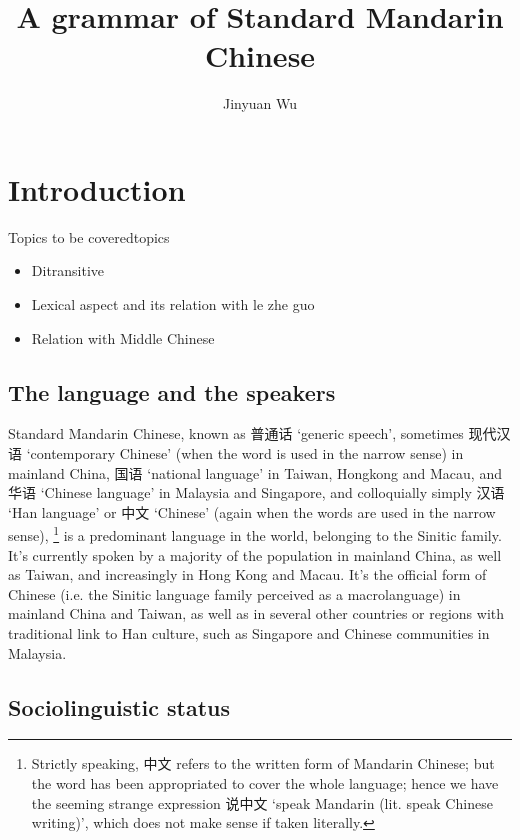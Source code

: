 \documentclass[UTF8, a4paper, oneside, scheme=plain, 12pt]{ctexrep}
\title{A grammar of Standard Mandarin Chinese}
\author{Jinyuan Wu}
\newcommand{\translate}[1]{`#1'}
\begin{document}
\automath

\maketitle

\chapter{Introduction}

\begin{todobox}{Topics to be covered}{topics}
    \begin{itemize}
        \item Ditransitive 
        \item Lexical aspect and its relation with le zhe guo
        \item Relation with Middle Chinese
    \end{itemize}
\end{todobox}

\section{The language and the speakers}

Standard Mandarin Chinese,
known as 普通话 \translate{generic speech}, 
sometimes 现代汉语 \translate{contemporary Chinese} 
(when the word is used in the narrow sense) 
in mainland China, 
国语 \translate{national language} in Taiwan, Hongkong and Macau,
and 华语 \translate{Chinese language} in Malaysia and Singapore,
and colloquially simply 汉语 \translate{Han language} or 中文 \translate{Chinese}
(again when the words are used in the narrow sense),%
\footnote{
    Strictly speaking, 中文 refers to the written form of Mandarin Chinese; 
    but the word has been appropriated to cover the whole language; 
    hence we have the seeming strange expression 
    说中文 \translate{speak Mandarin (lit. speak Chinese writing)},
    which does not make sense if taken literally.
}
is a predominant language in the world,
belonging to the Sinitic family.
It's currently spoken by a majority of the population in mainland China,
as well as Taiwan, 
and increasingly in Hong Kong and Macau.
It's the official form of Chinese 
(i.e. the Sinitic language family perceived as a macrolanguage)
in mainland China and Taiwan, 
as well as in several other countries or regions 
with traditional link to Han culture, 
such as Singapore and Chinese communities in Malaysia. 

\section{Sociolinguistic status}
\end{document}
